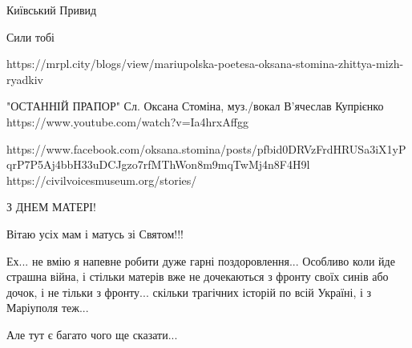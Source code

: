 Київський Привид

Сили тобі

https://mrpl.city/blogs/view/mariupolska-poetesa-oksana-stomina-zhittya-mizh-ryadkiv

"ОСТАННІЙ ПРАПОР" Сл. Оксана Стоміна, муз./вокал В'ячеслав Купрієнко
https://www.youtube.com/watch?v=Ia4hrxAffgg

https://www.facebook.com/oksana.stomina/posts/pfbid0DRVzFrdHRUSa3iX1yPqrP7P5Aj4bbH33uDCJgzo7rfMThWon8m9mqTwMj4n8F4H9l
https://civilvoicesmuseum.org/stories/%

З ДНЕМ МАТЕРІ!

Вітаю усіх мам і матусь зі Святом!!!

Ех... не вмію я напевне робити дуже гарні поздоровлення... Особливо коли йде
страшна війна, і стільки матерів вже не дочекаються з фронту своїх синів або
дочок, і не тільки з фронту... скільки трагічних історій по всій Україні, і з
Маріуполя теж...  

Але тут є багато чого ще сказати...  

